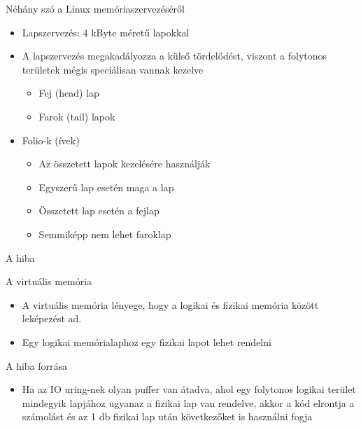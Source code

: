 \documentclass[12 pt]{beamer}
\begin{document}
\begin{frame}{Néhány szó a Linux memóriaszervezéséről}
  \begin{itemize}
    \item{Lapszervezés: 4 kByte méretű lapokkal}
    \item{A lapszervezés megakadályozza a külső tördelődést, viszont a folytonos területek mégis speciálisan vannak kezelve}
      \begin{itemize}
        \item{Fej (head) lap}
        \item{Farok (tail) lapok}
      \end{itemize}
    \item{Folio-k (ívek)}
      \begin{itemize}
        \item{Az összetett lapok kezelésére használják}
        \item{Egyszerű lap esetén maga a lap}
        \item{Összetett lap esetén a fejlap}
        \item{Semmiképp nem lehet faroklap}
      \end{itemize}
  \end{itemize}
\end{frame}

\begin{frame}{A hiba}
  \begin{block}{A virtuális memória}
    \begin{itemize}
      \item{A virtuális memória lényege, hogy a logikai és fizikai memória között leképezést ad.}
      \item{Egy logikai memórialaphoz egy fizikai lapot lehet rendelni}
    \end{itemize}
  \end{block}

  \begin{block}{A hiba forrása}
    \begin{itemize}
      \item{Ha az IO uring-nek olyan puffer van átadva, ahol egy folytonos logikai terület mindegyik lapjához ugyanaz a fizikai lap van rendelve, akkor a kód elrontja a számolást és az 1 db fizikai lap után következőket is használni fogja}
    \end{itemize}
  \end{block}
\end{frame}

\end{document}
